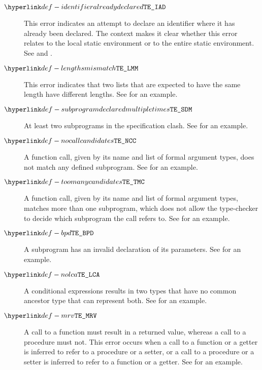 \begin{description}
\hypertarget{def-identifieralreadydeclared}{}
\item[$\IdentifierAlreadyDeclared$]
This error indicates an attempt to declare an identifier where it has already been declared.
The context makes it clear whether this error relates to the local static environment or to the
entire static environment.
See  and .

\hypertarget{def-lengthsmismatch}{}
\item[$\LengthsMismatch$]
This error indicates that two lists that are expected to have the same length have different lengths.
See  for an example.

\hypertarget{def-subprogramdeclaredmultipletimes}{}
\item[$\SubrogramDeclaredMultipleTimes$]
At least two subprograms in the specification clash.
See  for an example.

\hypertarget{def-nocallcandidates}{}
\item[$\NoCallCandidates$]
A function call, given by its name and list of formal argument types, does not match any defined subprogram.
See  for an example.

\hypertarget{def-toomanycandidates}{}
\item[$\TooManyCandidates$]
A function call, given by its name and list of formal argument types, matches more than one subprogram,
which does not allow the type-checker to decide which subprogram the call refers to.
See  for an example.

\hypertarget{def-badparameterdecl}{}
\item[$\BadParameterDecl$]
A subprogram has an invalid declaration of its parameters.
See  for an example.

\hypertarget{def-nolca}{}
\item[$\NoLCA$]
A conditional expressions results in two types that have no common ancestor type that can represent both.
See  for an example.

\hypertarget{def-mrv}{}
\item[$\MismatchedReturnValue$]
A call to a function must result in a returned value,
whereas a call to a procedure must not.
This error occurs when a call to a function or a getter is inferred to refer to a procedure or a setter,
or a call to a procedure or a setter is inferred to refer to a function or a getter.
See  for an example.


\end{description}
